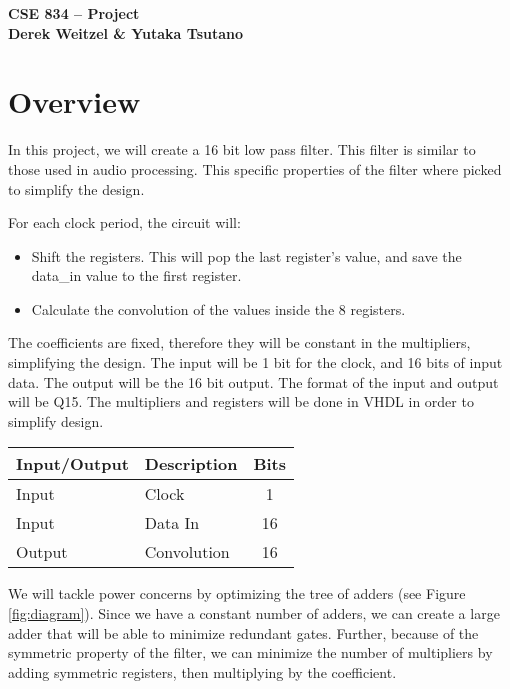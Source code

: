 \documentclass[12pt]{article}
\author{Derek Weitzel \& Yutaka Tsutano}
\begin{document}
\begin{center}
\textbf{
{ \LARGE CSE 834 -- Project} \\
Derek Weitzel \& Yutaka Tsutano
}
\end{center}











\section{Overview}
In this project, we will create a 16 bit low pass filter.  This filter is similar to those used in audio processing.  This specific properties of the filter where picked to simplify the design.

For each clock period, the circuit will:
\begin{itemize}
\item Shift the registers.  This will pop the last register's value, and save the data\_in value to the first register.
\item Calculate the convolution of the values inside the 8 registers.
\end{itemize}

The coefficients are fixed, therefore they will be constant in the multipliers, simplifying the design.  The input will be 1 bit for the clock, and 16 bits of input data.  The output will be the 16 bit output.  The format of the input and output will be Q15.  The multipliers  and registers will be done in VHDL in order to simplify design.

\begin{table}[ht]
\centering
\begin{tabular}{l | l | c}
\hline
Input/Output & Description & Bits \\
\hline \hline
Input & Clock & 1 \\
Input & Data In & 16 \\
Output & Convolution & 16 \\
\end{tabular}
\end{table}

We will tackle power concerns by optimizing the tree of adders (see Figure \ref{fig:diagram}).  Since we have a constant number of adders, we can create a large adder that will be able to minimize redundant gates.  Further, because of the symmetric property of the filter, we can minimize the number of multipliers by adding symmetric registers, then multiplying by the coefficient.  
\end{document}
